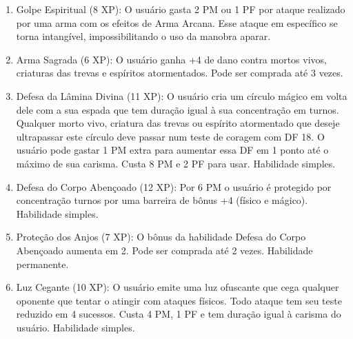 \begin{enumerate}
  \item Golpe Espiritual (8 XP): O usuário gasta 2 PM ou 1 PF por ataque realizado por uma arma com os efeitos de Arma Arcana. Esse ataque em específico se torna intangível, impossibilitando o uso da manobra aparar.    
        	
  
  	\item Arma Sagrada (6 XP): O usuário ganha +4 de dano contra mortos vivos, criaturas das trevas e espíritos atormentados. Pode ser comprada até 3 vezes.
 
 		\item Defesa da Lâmina Divina (11 XP): O usuário cria um círculo mágico em volta dele com a sua espada que tem duração igual à sua concentração em turnos. Qualquer morto vivo, criatura das trevas ou espírito atormentado que deseje ultrapassar este círculo deve passar num teste de coragem com DF 18. O usuário pode gastar 1 PM extra para aumentar essa DF em 1 ponto até o máximo de sua carisma. Custa 8 PM e 2 PF para usar. Habilidade simples.

 	\item Defesa do Corpo Abençoado (12 XP): Por 6 PM o usuário é protegido por concentração turnos por uma barreira de bônus +4 (físico e mágico). Habilidade simples.

	\item Proteção dos Anjos (7 XP): O bônus da habilidade Defesa do Corpo Abençoado aumenta em 2. Pode ser comprada até 2 vezes. Habilidade permanente.
  	
	\item Luz Cegante (10 XP): O usuário emite uma luz ofuscante que cega qualquer oponente que tentar o atingir com ataques físicos. Todo ataque tem seu teste reduzido em 4 sucessos. Custa 4 PM, 1 PF e tem duração igual à carisma do usuário. Habilidade simples.
 

\end{enumerate}
